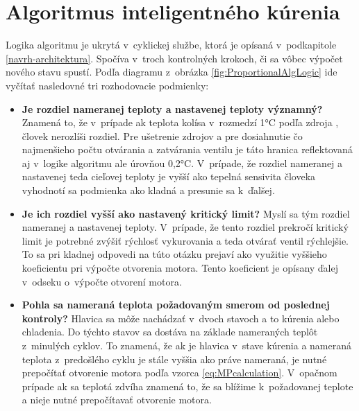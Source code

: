 \section{Algoritmus inteligentného  kúrenia}\label{navrh-algo}
Logika algoritmu je ukrytá v~cyklickej službe, ktorá je opísaná v~podkapitole \ref{navrh-architektura}. 
Spočíva v~troch kontrolných krokoch, či sa vôbec výpočet nového stavu spustí. Podľa diagramu z~obrázka \ref{fig:ProportionalAlgLogic} ide vyčítať nasledovné tri rozhodovacie podmienky:
\begin{itemize}
    \item \textbf{Je rozdiel nameranej teploty a nastavenej teploty významný?} Znamená to, že v~prípade ak teplota kolísa v~rozmedzí 1°C podľa zdroja \cite{TemperatureSensivity}, človek nerozlíši rozdiel. 
    Pre ušetrenie zdrojov a pre dosiahnutie čo najmenšieho počtu otvárania a zatvárania ventilu je táto hranica reflektovaná aj v~logike algoritmu ale úrovňou 0,2°C. 
    V~prípade, že rozdiel nameranej a nastavenej teda cieľovej teploty je vyšší ako tepelná sensivita človeka vyhodnotí sa podmienka ako kladná a presunie sa k~ďalšej. 
    \item \textbf{Je ich rozdiel vyšší ako nastavený kritický limit?} Myslí sa tým rozdiel nameranej a nastavenej teploty. 
    V~prípade, že tento rozdiel prekročí kritický limit je potrebné zvýšiť rýchlosť vykurovania a teda otvárať ventil rýchlejšie. To sa pri kladnej odpovedi na túto otázku prejaví ako využitie vyššieho koeficientu pri výpočte otvorenia motora. Tento koeficient je opísany ďalej v~odseku o~výpočte otvorení motora.
    \item \textbf{Pohla sa nameraná teplota požadovaným smerom od poslednej kontroly?} Hlavica sa môže nachádzať v~dvoch stavoch a to kúrenia alebo chladenia. 
    Do týchto stavov sa dostáva na základe nameraných teplôt z~minulých cyklov. 
    To znamená, že ak je hlavica v~stave kúrenia a nameraná teplota z~predošlého cyklu je stále vyššia ako práve nameraná, je nutné prepočítať otvorenie motora podľa vzorca \ref{eq:MPcalculation}.
    V~opačnom prípade ak sa teplotá zdvíha znamená to, že sa blížime k~požadovanej teplote a nieje nutné prepočítavať otvorenie motora.
\end{itemize}
